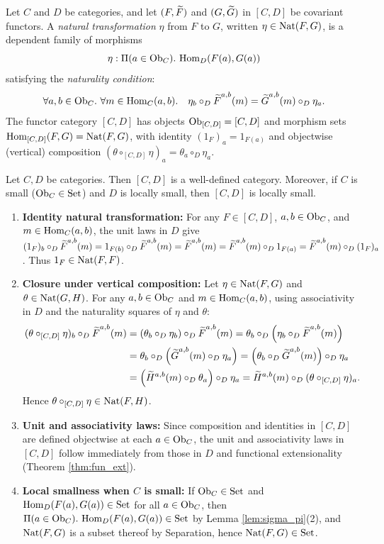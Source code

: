 \documentclass[10pt,a4paper]{article}
\begin{document}
\myqed
\begin{definition}\label{def:nat}
Let $C$ and $D$ be categories, and let $(F, {\widetilde{F}\textrm{}})$ and $(G, {\widetilde{G}\textrm{}})$ in $[C, D]$ be covariant functors. A \emph{natural transformation} $\eta$ from $F$ to $G$, written $\eta \in {\textrm{Nat}}(F, G)$, is a dependent family of morphisms
$$\eta : \Pi(a \in {\textrm{Ob}}_C).\ {\textrm{Hom}}_D(F(a), G(a))$$
satisfying the \emph{naturality condition}:
$$\forall a, b \in \Ob_C.\ \forall m \in \Hom_C(a,b).\quad \eta_b \circ_D \FMor^{a,b}(m) = \GMor^{a,b}(m) \circ_D \eta_a.$$
The functor category $[C, D]$ has objects ${\textrm{Ob}}_{[C,D]} = [C,D]$ and morphism sets ${\textrm{Hom}}_{[C,D]}(F,G) = {\textrm{Nat}}(F,G)$, with identity $\left(1_F\right)_a = 1_{F(a)}$ and objectwise (vertical) composition $(\theta \circ_{[C,D]} \eta)_a = \theta_a \circ_D \eta_a$.
\end{definition}

\begin{lemma}\label{lem:fun_cat}
Let $C, D$ be categories. Then $[C, D]$ is a well-defined category. Moreover, if $C$ is small (${\textrm{Ob}}_C \in {\textrm{Set}}$) and $D$ is locally small, then $[C, D]$ is locally small.
\end{lemma}
\myprf
\begin{enumerate}
\item \textbf{Identity natural transformation:} For any $F \in [C, D]$, $a, b \in {\textrm{Ob}}_C$, and $m \in {\textrm{Hom}}_C(a,b)$, the unit laws in $D$ give $(1_F)_b \circ_D {\widetilde{F}\textrm{}}^{a,b}(m) = 1_{F(b)} \circ_D {\widetilde{F}\textrm{}}^{a,b}(m) = {\widetilde{F}\textrm{}}^{a,b}(m) = {\widetilde{F}\textrm{}}^{a,b}(m) \circ_D 1_{F(a)} = {\widetilde{F}\textrm{}}^{a,b}(m) \circ_D (1_F)_a$. Thus $1_F \in {\textrm{Nat}}(F, F)$.
\item \textbf{Closure under vertical composition:} Let $\eta \in {\textrm{Nat}}(F, G)$ and $\theta \in {\textrm{Nat}}(G, H)$. For any $a, b \in {\textrm{Ob}}_C$ and $m \in {\textrm{Hom}}_C(a,b)$, using associativity in $D$ and the naturality squares of $\eta$ and $\theta$:
\begin{align*}
(\theta \circ_{[C,D]} \eta)_b \circ_D {\widetilde{F}\textrm{}}^{a,b}(m) &= (\theta_b \circ_D \eta_b) \circ_D {\widetilde{F}\textrm{}}^{a,b}(m) = \theta_b \circ_D \left(\eta_b \circ_D {\widetilde{F}\textrm{}}^{a,b}(m)\right) \\
&= \theta_b \circ_D \left({\widetilde{G}\textrm{}}^{a,b}(m) \circ_D \eta_a\right) = \left(\theta_b \circ_D {\widetilde{G}\textrm{}}^{a,b}(m)\right) \circ_D \eta_a \\
&= \left(\widetilde{H}^{a,b}(m) \circ_D \theta_a\right) \circ_D \eta_a = \widetilde{H}^{a,b}(m) \circ_D (\theta \circ_{[C,D]} \eta)_a.
\end{align*}
Hence $\theta \circ_{[C,D]} \eta \in {\textrm{Nat}}(F, H)$.
\item \textbf{Unit and associativity laws:} Since composition and identities in $[C, D]$ are defined objectwise at each $a \in {\textrm{Ob}}_C$, the unit and associativity laws in $[C, D]$ follow immediately from those in $D$ and functional extensionality (Theorem \ref{thm:fun_ext}).
\item \textbf{Local smallness when $C$ is small:} If ${\textrm{Ob}}_C \in {\textrm{Set}}$ and ${\textrm{Hom}}_D(F(a), G(a)) \in {\textrm{Set}}$ for all $a \in {\textrm{Ob}}_C$, then $\Pi(a \in {\textrm{Ob}}_C).\ {\textrm{Hom}}_D(F(a), G(a)) \in {\textrm{Set}}$ by Lemma \ref{lem:sigma_pi}(2), and ${\textrm{Nat}}(F, G)$ is a subset thereof by Separation, hence ${\textrm{Nat}}(F, G) \in {\textrm{Set}}$.
\end{enumerate}
\myqed
\end{document}
